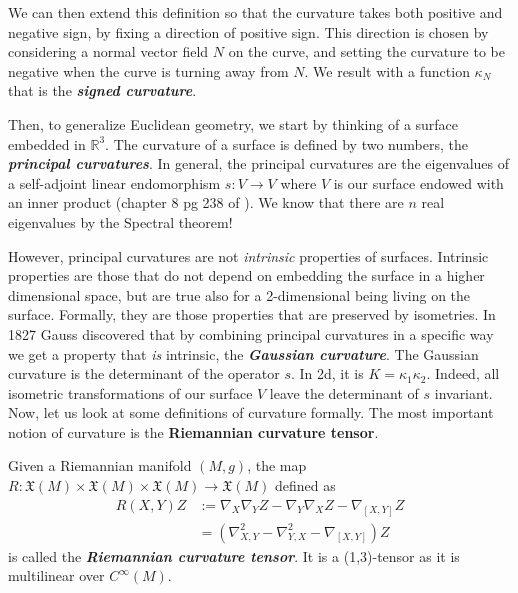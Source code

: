 \documentclass[a4paper,12pt,reqno]{amsbook}
\theoremstyle{definition} %
\newcommand{\1}{\mathbbm{1}}
\newcommand{\R}{\ensuremath{\mathbb{R}}}
\theoremstyle{plain}
\theoremstyle{remark}
\begin{document}
We can then extend this definition so that the curvature takes both positive and negative sign, by fixing a direction of positive sign. This direction is chosen by considering a normal vector field $N$ on the curve, and setting the curvature to be negative when the curve is turning away from $N$. We result with a function $\kappa_N$ that is the \textit{\textbf{signed curvature}}. 

Then, to generalize Euclidean geometry, we start by thinking of a surface embedded in $\R^3$. The curvature of a surface is defined by two numbers, the \textit{\textbf{principal curvatures}}. In general, the principal curvatures are the eigenvalues of a self-adjoint linear endomorphism $s:V\to V$ where $V$ is our surface endowed with an inner product (chapter 8 pg 238 of \cite{lee2018riemann}). We know that there are $n$ real eigenvalues by the Spectral theorem! 

However, principal curvatures are not \emph{intrinsic} properties of surfaces. Intrinsic properties are those that do not depend on embedding the surface in a higher dimensional space, but are true also for a 2-dimensional being living on the surface. Formally, they are those properties that are preserved by isometries. 
In 1827 Gauss discovered that by combining principal curvatures in a specific way we get a property that \textit{is} intrinsic, the \textit{\textbf{Gaussian curvature}}. The Gaussian curvature is the determinant of the operator $s$. In 2d, it is $K=\kappa_1\kappa_2$. Indeed, all isometric transformations of our surface $V$ leave the determinant of $s$ invariant.
\\

Now, let us look at some definitions of curvature formally. 
The most important notion of curvature is the \textbf{Riemannian curvature tensor}.  
\begin{definition}
    Given a Riemannian manifold $(M,g)$, the map $R: \mathfrak{X}(M) \times \mathfrak{X}(M) \times \mathfrak{X}(M) \to \mathfrak{X}(M)$ defined as
    \begin{align*}
            R(X,Y)Z&:=\nabla_X\nabla_YZ-\nabla_Y\nabla_XZ -\nabla_{[X,Y]}Z\\
            &= (\nabla^2_{X,Y} -\nabla^2_{Y,X} - \nabla_{[X,Y]}) Z
    \end{align*}
    is called the \textbf{\emph{Riemannian curvature tensor}}. It is a (1,3)-tensor as it is multilinear over $C^\infty(M).$
\end{definition}
\end{document}
